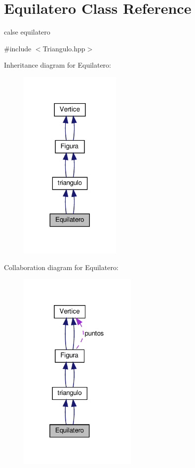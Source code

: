 \hypertarget{class_equilatero}{}\section{Equilatero Class Reference}
\label{class_equilatero}


calse equilatero  




{\ttfamily \#include $<$Triangulo.\+hpp$>$}



Inheritance diagram for Equilatero\+:
\nopagebreak
\begin{figure}[H]
\begin{center}
\leavevmode
\includegraphics[width=140pt]{class_equilatero__inherit__graph}
\end{center}
\end{figure}


Collaboration diagram for Equilatero\+:
\nopagebreak
\begin{figure}[H]
\begin{center}
\leavevmode
\includegraphics[width=163pt]{class_equilatero__coll__graph}
\end{center}
\end{figure}
